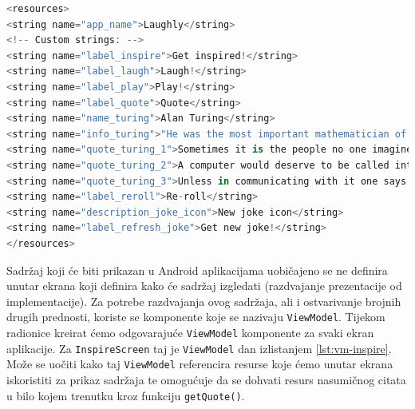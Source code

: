 \documentclass[11pt,a4paper,twoside]{article}
\begin{document}
\begin{lstlisting}[caption={Glavna aktivnost - MainActivity.kt}, label={lst:activity-main}, language=Kotlin]
<resources>
<string name="app_name">Laughly</string>
<!-- Custom strings: -->
<string name="label_inspire">Get inspired!</string>
<string name="label_laugh">Laugh!</string>
<string name="label_play">Play!</string>
<string name="label_quote">Quote</string>
<string name="name_turing">Alan Turing</string>
<string name="info_turing">"He was the most important mathematician of the second world war. He helped to break the German's Enigma code at Blatchley Park, by designing a computer to decipher the German messages called the Bombe. The most important effects of this revolutionary invention were:\n - Shortening the length of the war: by decoding the German's messages Blatchley Park's team was able to identify the position of all Nazi's boats so the Royal Navy was able to protect English naval fleet from u-boats's attacks.\n - Saving millions lives: the avoided attacks permit a lot of people to stay in life. Turing's team, on the other hand, had to avoid that German discover that  Enigma had been decrypted. An electromechanical device that helped the code-breakers to calculate the key of the day the German were using on their Enigma machine.Using a menu provided by the codebreaking team from a crib (plaintext that corresponded to ciphertext), the Bombe operators could quickly set up the machine and let it calculate possible Enigma settings.\n  After the war Alan Turing came up with Turing Test, a method to test artificial intelligence.Persecuted for homosexual acts, he committed suicide in 1954.\n"</string>
<string name="quote_turing_1">Sometimes it is the people no one imagines anything of who do the things that no one can imagine.</string>
<string name="quote_turing_2">A computer would deserve to be called intelligent if it could deceive a human into believing that it was human.</string>
<string name="quote_turing_3">Unless in communicating with it one says exactly what one means, trouble is bound to result.</string>
<string name="label_reroll">Re-roll</string>
<string name="description_joke_icon">New joke icon</string>
<string name="label_refresh_joke">Get new joke!</string>
</resources>
\end{lstlisting}

Sadržaj koji će biti prikazan u Android aplikacijama uobičajeno se ne definira unutar ekrana koji definira kako će sadržaj izgledati (razdvajanje prezentacije od implementacije). Za potrebe razdvajanja ovog sadržaja, ali i ostvarivanje brojnih drugih prednosti, koriste se komponente koje se nazivaju \texttt{ViewModel}. Tijekom radionice kreirat ćemo odgovarajuće \texttt{ViewModel} komponente za svaki ekran aplikacije. Za \texttt{InspireScreen} taj je \texttt{ViewModel} dan izlistanjem \ref{lst:vm-inspire}. Može se uočiti kako taj \texttt{ViewModel} referencira resurse koje ćemo unutar ekrana iskoristiti za prikaz sadržaja te omogućuje da se dohvati resurs nasumičnog citata u bilo kojem trenutku kroz funkciju \texttt{getQuote()}.
\end{document}
